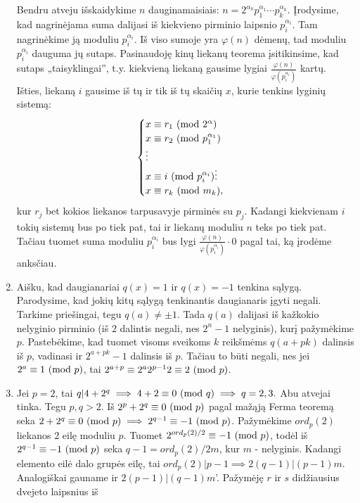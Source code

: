 \begin{enumerate}
    Bendru atveju išskaidykime $n$ dauginamaisiais: $n=2^{\alpha_0}p_1^{\alpha_1}\cdots
    p_k^{\alpha_k}$. Įrodysime, kad nagrinėjama suma dalijasi iš kiekvieno
    pirminio laipsnio $p_i^{\alpha_i}$. Tam nagrinėkime ją moduliu
    $p_i^{\alpha_i}$. Iš viso sumoje yra $\varphi(n)$ dėmenų, tad moduliu
    $p_i^{\alpha_i}$ dauguma jų sutaps. Pasinaudoję kinų liekanų teorema
    įsitikinsime, kad sutaps „taisyklingai'', t.y. kiekvieną liekaną
    gausime lygiai $\frac{\varphi(n)}{\varphi(p_i^{\alpha_i})}$ kartų.
    Išties, liekaną $i$ gausime iš tų ir tik iš tų skaičių $x$, kurie tenkins lyginių
    sistemą: 
    $$\begin{cases}
      x \equiv r_1 \ (\text{mod } 2^{\alpha})\\
      x \equiv r_2 \ (\text{mod } p_1^{\alpha_1})\\
      \vdots\\
      x \equiv i \ (\text{mod } p_i^{\alpha_i})
      \vdots\\
      x \equiv r_k \ (\text{mod } m_k),
    \end{cases}$$
    kur $r_j$ bet kokios liekanos tarpusavyje pirminės su $p_j$. Kadangi
    kiekvienam $i$ tokių sistemų bus po tiek pat, tai ir liekanų moduliu
    $n$ teks po tiek pat. Tačiau tuomet suma moduliu $p_i^{\alpha_i}$ bus
    lygi $\frac{\varphi(n)}{\varphi(p_i^{\alpha_i})}\cdot 0$ pagal tai, ką
    įrodėme anksčiau.
\item
    Aišku, kad daugianariai $q(x)=1$ ir $q(x)=-1$ tenkina sąlygą. Parodysime, kad jokių
    kitų sąlygą tenkinantis daugianaris įgyti negali. Tarkime priešingai,
    tegu $q(a) \neq \pm 1$. Tada $q(a)$ dalijasi iš kažkokio nelyginio
    pirminio (iš $2$ dalintis negali, nes $2^n - 1$ nelyginis), kurį
    pažymėkime $p$. Pastebėkime, kad tuomet visoms sveikoms $k$ reikšmėms
    $q(a+pk)$ dalinsis iš $p$, vadinasi ir $2^{a+pk} - 1$ dalinsis iš $p$. Tačiau
    to būti negali, nes jei $2^a \equiv 1 \ (\text{mod } p)$, tai $2^{a+p} \equiv
    2^a2^{p-1}2 \equiv 2 \ (\text{mod } p)$.
\item
    Jei $p=2$, tai $q|4 + 2^q \implies 4 + 2 \equiv 0 \ (\text{mod } q) \implies
    q=2,3.$ Abu atvejai tinka. 
    Tegu $p,q > 2$. Iš $2^p + 2^q \equiv 0 \ (\text{mod } p)$ pagal mažąją Ferma teoremą seka
    $2 + 2^q \equiv 0 \ (\text{mod } p) \implies 2^{q-1} \equiv -1\ (\text{mod } p)$. Pažymėkime
    $ord_p(2)$ liekanos $2$ eilę moduliu $p$. Tuomet $2^{ord_p(2)/2} \equiv
    -1\ (\text{mod } p)$, todėl iš $2^{q-1} \equiv -1\ (\text{mod } p)$ seka $q-1 = ord_p(2)/2m$, kur
    $m$ - nelyginis. Kadangi elemento eilė dalo grupės eilę, tai
    $ord_p(2)|p-1 \implies 2(q-1)|(p-1)m$. Analogiškai gauname ir
    $2(p-1)|(q-1)m$'. Pažymėję $r$ ir $s$ didžiausius dvejeto laipsnius iš

\end{enumerate}
